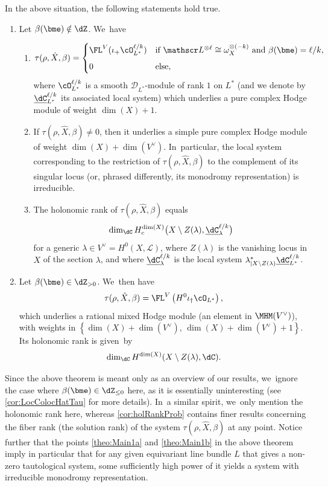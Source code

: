 \begin{thm}\label{theo:Main}
In the above situation, the following statements hold true.
\begin{enumerate}
\item\label{theo:Main1}
Let $\beta(\bme) \notin \dZ$. We~have
\begin{enumerate}
\item\label{theo:Main1a}
\[
\tau(\rho, \hat{X}, \beta)
=
\begin{cases}
\FL^V(\iota_+ \cO_{L^*}^{\ell/k}) &\textup{if } \mathscr L^{\otimes \ell} \cong \omega^{\otimes (-k)}_X \textup{ and }\beta(\bme) = \ell/k,\\[
5pt]
0 & \textup{else},
\end{cases}
\]
where $\cO_{L^*}^{\ell/k}$ is a smooth $\mathscr{D}_{L^*}$\nobreakdash-mod\-ule of rank $1$ on $L^*$ (and we denote by $\underline{\dC}_{L^*}^{\ell/k}$
its associated local system) which underlies a pure complex Hodge module of weight $\dim(X)+1$.
\item\label{theo:Main1b}
If $\tau(\rho, \hat{X}, \beta)\neq 0$, then it underlies a simple pure complex Hodge module of weight $\dim(X)+\dim(V^\vee)$. In~particular, the local system corresponding to the restriction of $\tau(\rho, \hat{X}, \beta)$ to the complement of its singular locus (or, phrased differently, its monodromy representation) is irreducible.
\item\label{theo:Main1c}
The holonomic rank of $\tau(\rho, \hat{X}, \beta)$ equals
\[
\dim_\dC H^{\dim(X)}_c\bigl(X \setminus Z(\lambda), \underline{\dC}_\lambda^{\ell/k}\bigr)
\]
for a generic $\lambda\in V^\vee=H^0(X,\mathscr{L})$, where
$Z(\lambda)$ is the vanishing locus in $X$ of the section $\lambda$, and where
$\underline{\dC}_\lambda^{\ell/k}$ is the local system
$\lambda_{|X\setminus Z(\lambda)}^* \underline{\dC}_{L^*}^{\ell/k}$.
\end{enumerate}
\item\label{theo:Main2}
Let $\beta(\bme) \in \dZ_{>0}$. We~then have
\[
\tau(\rho, \hat{X}, \beta) = \FL^V\left(H^0 \iota_\dag \cO_{L^*}\right),
\]
which underlies a rational mixed Hodge module (\ie an element in $\MHM(V^\vee)$), with weights in $\left\{\dim(X)+\dim(V^\vee),\, \dim(X)+\dim(V^\vee)+1\right\}$. Its holonomic rank is given~by
\[
\dim_\dC H^{\dim(X)}(X\setminus Z(\lambda), \dC).
\]
\end{enumerate}
\end{thm}
Since the above theorem is meant only as an overview of our results, we~ignore the case where $\beta(\bme)\in \dZ_{\leq 0}$ here, as it is essentially uninteresting (see \cref{cor:LocColocHatTau} for more details). In~a similar spirit, we~only mention the holonomic rank here, whereas
\cref{cor:holRankProb} contains finer results concerning the fiber rank (\resp the solution rank) of the system $\tau(\rho, \hat{X}, \beta)$ at any point. Notice further that the points \eqref{theo:Main1a} and \eqref{theo:Main1b} in the above theorem imply in particular that for any given equivariant line bundle $L$ that gives a non-zero tautological system, some sufficiently high power of it yields a system with irreducible monodromy representation.

